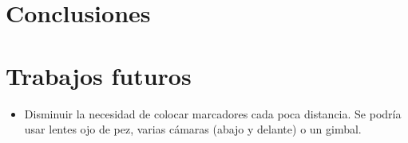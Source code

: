 \chapter{Conclusiones} \label{chp-conclusiones}

\chapter{Trabajos futuros}

\begin{itemize}
\item Disminuir la necesidad de colocar marcadores cada poca distancia. Se podría usar lentes ojo de pez, varias cámaras (abajo y delante) o un gimbal.  
\end{itemize}

\endinput
